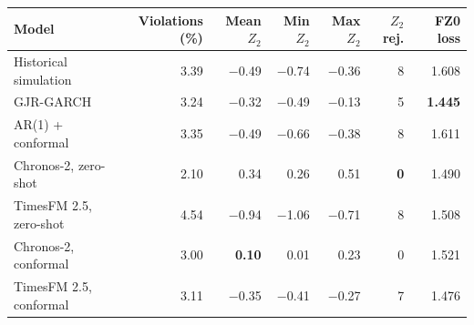 \begin{tabular}{lrrrrrr}
\toprule
Model & Violations (\%) & Mean $Z_2$ & Min $Z_2$ & Max $Z_2$ & $Z_2$ rej. & FZ0 loss \\
\midrule
Historical simulation & 3.39 & $-$0.49 & $-$0.74 & $-$0.36 & 8 & 1.608 \\
GJR-GARCH & 3.24 & $-$0.32 & $-$0.49 & $-$0.13 & 5 & \textbf{1.445} \\
AR(1) + conformal & 3.35 & $-$0.49 & $-$0.66 & $-$0.38 & 8 & 1.611 \\
Chronos-2, zero-shot & 2.10 & 0.34 & 0.26 & 0.51 & \textbf{0} & 1.490 \\
TimesFM 2.5, zero-shot & 4.54 & $-$0.94 & $-$1.06 & $-$0.71 & 8 & 1.508 \\
Chronos-2, conformal & 3.00 & \textbf{0.10} & 0.01 & 0.23 & 0 & 1.521 \\
TimesFM 2.5, conformal & 3.11 & $-$0.35 & $-$0.41 & $-$0.27 & 7 & 1.476 \\
\bottomrule
\end{tabular}
